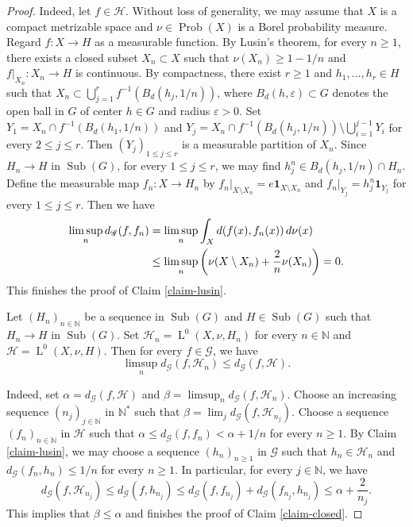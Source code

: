 \documentclass[10pt,a4paper]{amsart}
\newcommand{\N}{\mathbb{N}}
\newcommand{\Prob}{\operatorname{Prob}}
\newcommand{\Sub}{\operatorname{Sub}}
\newcommand{\rL}{\operatorname{L}}
\begin{document}
\begin{proof}
Indeed, let $f \in \mathscr H$. Without loss of generality, we may assume that $X$ is a compact metrizable space and $\nu \in \Prob(X)$ is a Borel probability measure. Regard $f : X \to H$ as a measurable function. By Lusin's theorem, for every $n \geq 1$, there exists a closed subset $X_n \subset X$ such that $\nu(X_n) \geq 1 - 1/n$ and $f|_{X_n} : X_n \to H$ is continuous. By compactness, there exist $r \geq 1$ and $h_1, \dots, h_r \in H$ such that $X_n \subset \bigcup_{j = 1}^r f^{-1}(B_{d}(h_j, 1/n))$, where $B_d(h, \varepsilon) \subset G$ denotes the open ball in $G$ of center $h \in G$ and radius $\varepsilon > 0$. Set $Y_1 = X_n \cap f^{-1}(B_{d}(h_1, 1/n))$ and $Y_j = X_n \cap f^{-1}(B_{d}(h_j, 1/n)) \setminus \bigcup_{i = 1}^{j - 1} Y_i$ for every $2 \leq j \leq r$. Then $(Y_j)_{1 \leq j \leq r}$ is a measurable partition of $X_n$. Since $H_n \to H$ in $\Sub(G)$, for every $1 \leq j \leq r$, we may find $h_j^n \in B_{d}(h_j, 1/n) \cap H_n$. Define the measurable map $f_n : X \to H_n$ by $f_n|_{X \setminus X_n} = e \mathbf 1_{X \setminus X_n}$ and $f_n|_{Y_j} = h_j^n \mathbf 1_{Y_j}$ for every $1 \leq j \leq r$. Then we have
\begin{align*}
\limsup_n d_{\mathscr G}(f, f_n) &= \limsup_n \int_X d(f(x), f_n(x)) \,{\rm d}\nu(x) \\
&\leq \limsup_n \left(\nu(X \setminus X_n) + \frac2n \nu(X_n) \right) =0.
\end{align*}
This finishes the proof of Claim \ref{claim-lusin}.

\begin{claim}\label{claim-closed}
Let $(H_n)_{n \in \N}$ be a sequence in $\Sub(G)$ and $H \in \Sub(G)$ such that $H_n \to H$ in $\Sub(G)$. Set $\mathscr H_n = \rL^0(X, \nu, H_n)$ for every $n \in \N$ and $\mathscr H = \rL^0(X, \nu, H)$. Then for every $f \in \mathscr G$, we have
$$\limsup_n d_{\mathscr G}(f, \mathscr H_n) \leq d_{\mathscr G}(f, \mathscr H).$$
\end{claim}

Indeed, set $\alpha = d_{\mathscr G}(f, \mathscr H)$ and $\beta = \limsup_n d_{\mathscr G}(f, \mathscr H_n)$. Choose an increasing sequence $(n_j)_{j \in \N}$ in $\N^*$ such that $\beta = \lim_j d_{\mathscr G}(f, \mathscr H_{n_j})$. Choose a sequence $(f_n)_{n \in \N}$ in $\mathscr H$ such that $\alpha \leq d_{\mathscr G}(f, f_n) < \alpha + 1/n$ for every $n \geq 1$. By Claim \ref{claim-lusin}, we may choose a sequence $(h_n)_{n \geq 1}$ in $\mathscr G$ such that $h_n \in \mathscr H_n$ and $d_{\mathscr G}(f_n, h_n) \leq 1/n$ for every $n \geq 1$. In particular, for every $j \in \N$, we have 
$$d_{\mathscr G}(f, \mathscr H_{n_j}) \leq d_{\mathscr G}(f, h_{n_j}) \leq d_{\mathscr G}(f, f_{n_j}) + d_{\mathscr G}(f_{n_j}, h_{n_j}) \leq \alpha + \frac{2}{n_j}.$$
This implies that $\beta \leq \alpha$ and finishes the proof of Claim \ref{claim-closed}.


\end{proof}
\end{document}
